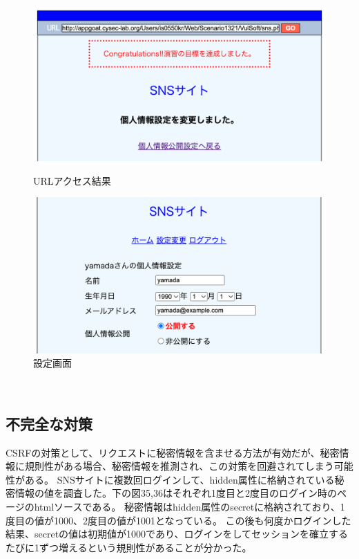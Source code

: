 \documentclass[dvipdfmx,autodetect-engine,titlepage]{jsarticle}
\begin{document}
\begin{figure}[H]
  \centering
  \begin{minipage}[b]{0.45\linewidth}
  \begin{center}
    \includegraphics[keepaspectratio,scale=0.3]{cs4.png}
    \end{center}
    \caption{URLアクセス結果}
  \end{minipage}
  \begin{minipage}[b]{0.45\linewidth}
  \begin{center}
    \includegraphics[keepaspectratio,scale=0.3]{cs5.png}
    \end{center}
    \caption{設定画面}
  \end{minipage}
\end{figure}

　

\subsection{不完全な対策}

CSRFの対策として、リクエストに秘密情報を含ませる方法が有効だが、秘密情報に規則性がある場合、秘密情報を推測され、この対策を回避されてしまう可能性がある。
SNSサイトに複数回ログインして、hidden属性に格納されている秘密情報の値を調査した。下の図35,36はそれぞれ1度目と2度目のログイン時のページのhtmlソースである。
秘密情報はhidden属性のsecretに格納されており、1度目の値が1000、2度目の値が1001となっている。
この後も何度かログインした結果、secretの値は初期値が1000であり、ログインをしてセッションを確立するたびに1ずつ増えるという規則性があることが分かった。\\
\end{document}
